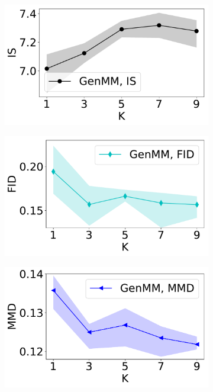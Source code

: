\begin{figure}[!tp]
  \captionsetup[subfigure]{justification=centering}
  \centering
  \begin{subfigure}{.24\textwidth}
    \centering
    \includegraphics[width=1\linewidth]{images/mnist/scores/std1EMGM-NM/EMGM-NM-IS-K.pdf}
  \end{subfigure}
  \vspace{-2pt}
  \begin{subfigure}{.24\textwidth}
    \centering
    \includegraphics[width=1\linewidth]{images/mnist/scores/std1EMGM-NM/EMGM-NM-FID-K.pdf}
  \end{subfigure}
  \centering
  \begin{subfigure}{.24\textwidth}
    \centering
    \includegraphics[width=1\linewidth]{images/mnist/scores/std1EMGM-NM/EMGM-NM-MMD-K.pdf}

\end{subfigure}
\end{figure}
